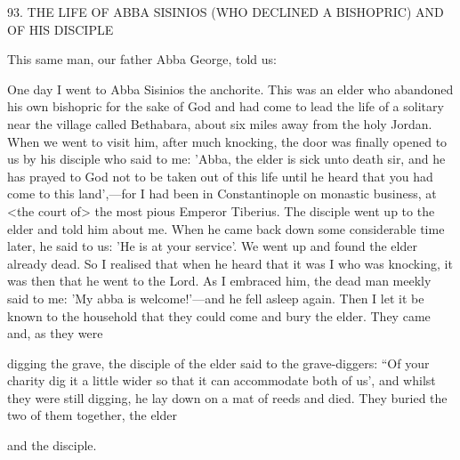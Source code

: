 93.
THE LIFE OF ABBA SISINIOS
(WHO DECLINED A BISHOPRIC)
AND OF HIS DISCIPLE

This same man, our father Abba George, told us:

One day I went to Abba Sisinios the anchorite.
This was an elder
who abandoned his own bishopric for the sake of God and had
come to lead the life of a solitary near the village called Bethabara,
about six miles away from the holy Jordan.
When we went to visit
him, after much knocking, the door was finally opened to us by his
disciple who said to me: 'Abba, the elder is sick unto death sir, and
he has prayed to God not to be taken out of this life until he heard
that you had come to this land',—for I had been in Constantinople
on monastic business, at <the court of> the most pious Emperor
Tiberius.
The disciple went up to the elder and told him about me.
When he came back down some considerable time later, he said to
us: 'He is at your service'.
We went up and found the elder already
dead.
So I realised that when he heard that it was I who was
knocking, it was then that he went to the Lord.
As I embraced him,
the dead man meekly said to me: 'My abba is welcome!'—and he
fell asleep again.
Then I let it be known to the household that they
could come and bury the elder.
They came and, as they were

digging the grave, the disciple of the elder said to the grave-diggers:
“Of your charity dig it a little wider so that it can accommodate
both of us', and whilst they were still digging, he lay down on a mat
of reeds and died.
They buried the two of them together, the elder

and the disciple.

